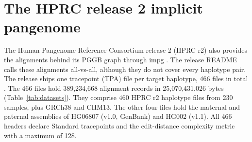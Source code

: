 \section{The HPRC release 2 implicit pangenome}
\label{sec:release}

The Human Pangenome Reference Consortium release 2 (HPRC r2) also provides the alignments behind its PGGB graph through impg \citep{HPRC2026resources,Garrison2024pggb}.
The release README calls these alignments all-vs-all, although they do not cover every haplotype pair.
The release ships one tracepoint (TPA) file per target haplotype, 466 files in total \citep{Kaushan2026tracepoints,Guarracino2026tpa}.
The 466 files hold 389,234,668 alignment records in 25,070,431,026 bytes (Table~\ref{tab:datasets}).
They comprise 460 HPRC r2 haplotype files from 230 samples, plus GRCh38 and CHM13.
The other four files hold the maternal and paternal assemblies of HG06807 (v1.0, GenBank) and HG002 (v1.1).
All 466 headers declare Standard tracepoints and the edit-distance complexity metric with a maximum of 128.


